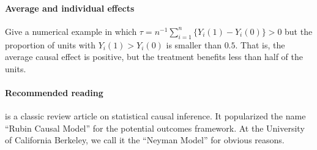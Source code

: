 \paragraph{Average and individual effects}

Give a numerical example in which $\tau = n^{-1} \sum_{i=1}^n  \{ Y_i(1) - Y_i(0) \}  >0$ but the proportion of units with $Y_i(1) > Y_i(0)$ is smaller than $0.5$. That is, the average causal effect is positive, but the treatment benefits less than half of the units. 


\paragraph{Recommended reading}

\citet{holland1986statistics} is a classic review article on statistical causal inference. It popularized the name ``Rubin Causal Model'' for the potential outcomes framework. At the University of California Berkeley, we call it the ``Neyman Model'' for obvious reasons.  


